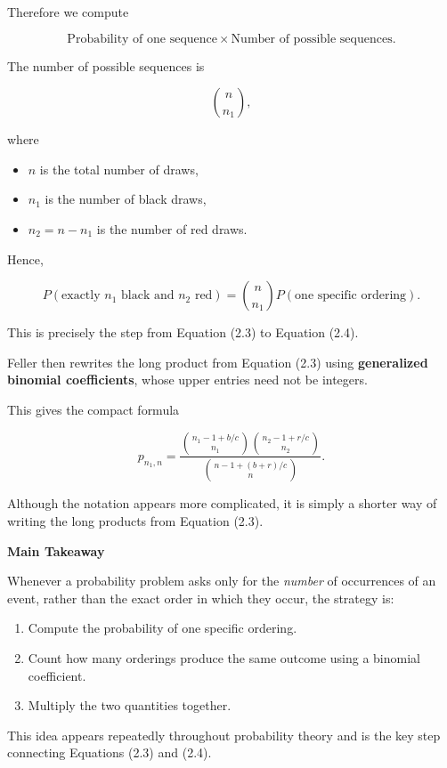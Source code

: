 \documentclass[12pt]{article}
\begin{document}
Therefore we compute

\[
\text{Probability of one sequence}
\times
\text{Number of possible sequences}.
\]

The number of possible sequences is

\[
\binom{n}{n_1},
\]

where

\begin{itemize}
    \item $n$ is the total number of draws,
    \item $n_1$ is the number of black draws,
    \item $n_2=n-n_1$ is the number of red draws.
\end{itemize}

Hence,

\[
P(\text{exactly }n_1\text{ black and }n_2\text{ red})
=
\binom{n}{n_1}
P(\text{one specific ordering}).
\]

This is precisely the step from Equation (2.3) to Equation (2.4).

\bigskip

Feller then rewrites the long product from Equation (2.3) using
\textbf{generalized binomial coefficients}, whose upper entries need not
be integers.

This gives the compact formula

\[
p_{n_1,n}
=
\frac{
\binom{n_1-1+b/c}{n_1}
\binom{n_2-1+r/c}{n_2}
}{
\binom{n-1+(b+r)/c}{n}
}.
\tag{2.4}
\]

Although the notation appears more complicated, it is simply a shorter
way of writing the long products from Equation (2.3).

\bigskip

\textbf{Main Takeaway}

Whenever a probability problem asks only for the \emph{number} of
occurrences of an event, rather than the exact order in which they
occur, the strategy is:

\begin{enumerate}
    \item Compute the probability of one specific ordering.
    \item Count how many orderings produce the same outcome using a
          binomial coefficient.
    \item Multiply the two quantities together.
\end{enumerate}

This idea appears repeatedly throughout probability theory and is the
key step connecting Equations (2.3) and (2.4).
\end{document}
